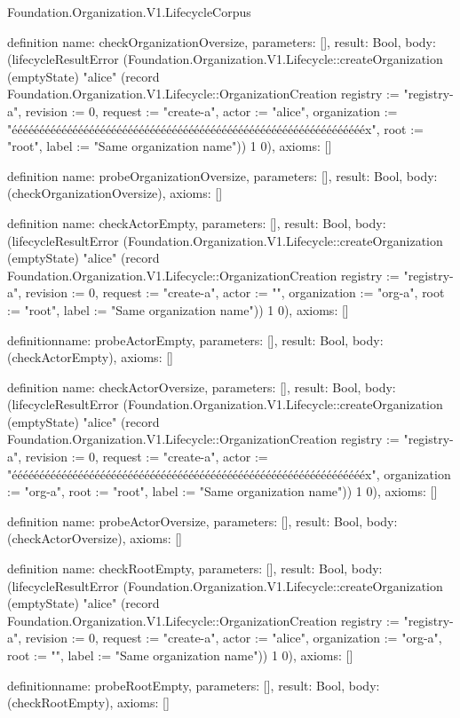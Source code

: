\begin{lexlean}{Foundation.Organization.V1.LifecycleCorpus}
\begin{semanticmodule}
definition{
  name: checkOrganizationOversize,
  parameters: [],
  result: Bool,
  body: (lifecycleResultError (Foundation.Organization.V1.Lifecycle::createOrganization (emptyState) "alice" (record Foundation.Organization.V1.Lifecycle::OrganizationCreation {registry := "registry-a", revision := 0, request := "create-a", actor := "alice", organization := "ééééééééééééééééééééééééééééééééééééééééééééééééééééééééééééééééx", root := "root", label := "Same organization name"})) 1 0),
  axioms: []
}

definition{
  name: probeOrganizationOversize,
  parameters: [],
  result: Bool,
  body: (checkOrganizationOversize),
  axioms: []
}

definition{
  name: checkActorEmpty,
  parameters: [],
  result: Bool,
  body: (lifecycleResultError (Foundation.Organization.V1.Lifecycle::createOrganization (emptyState) "alice" (record Foundation.Organization.V1.Lifecycle::OrganizationCreation {registry := "registry-a", revision := 0, request := "create-a", actor := "", organization := "org-a", root := "root", label := "Same organization name"})) 1 0),
  axioms: []
}

definition{name: probeActorEmpty, parameters: [], result: Bool, body: (checkActorEmpty), axioms: []}

definition{
  name: checkActorOversize,
  parameters: [],
  result: Bool,
  body: (lifecycleResultError (Foundation.Organization.V1.Lifecycle::createOrganization (emptyState) "alice" (record Foundation.Organization.V1.Lifecycle::OrganizationCreation {registry := "registry-a", revision := 0, request := "create-a", actor := "ééééééééééééééééééééééééééééééééééééééééééééééééééééééééééééééééx", organization := "org-a", root := "root", label := "Same organization name"})) 1 0),
  axioms: []
}

definition{
  name: probeActorOversize,
  parameters: [],
  result: Bool,
  body: (checkActorOversize),
  axioms: []
}

definition{
  name: checkRootEmpty,
  parameters: [],
  result: Bool,
  body: (lifecycleResultError (Foundation.Organization.V1.Lifecycle::createOrganization (emptyState) "alice" (record Foundation.Organization.V1.Lifecycle::OrganizationCreation {registry := "registry-a", revision := 0, request := "create-a", actor := "alice", organization := "org-a", root := "", label := "Same organization name"})) 1 0),
  axioms: []
}

definition{name: probeRootEmpty, parameters: [], result: Bool, body: (checkRootEmpty), axioms: []}


\end{semanticmodule}
\end{lexlean}
